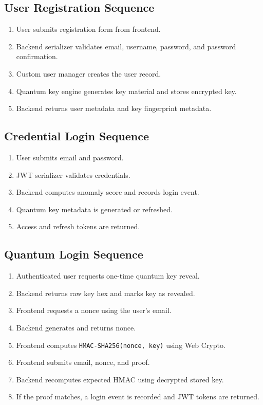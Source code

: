 \documentclass[12pt,a4paper]{report}
\begin{document}
\subsection{User Registration Sequence}
\begin{enumerate}
    \item User submits registration form from frontend.
    \item Backend serializer validates email, username, password, and password confirmation.
    \item Custom user manager creates the user record.
    \item Quantum key engine generates key material and stores encrypted key.
    \item Backend returns user metadata and key fingerprint metadata.
\end{enumerate}

\subsection{Credential Login Sequence}
\begin{enumerate}
    \item User submits email and password.
    \item JWT serializer validates credentials.
    \item Backend computes anomaly score and records login event.
    \item Quantum key metadata is generated or refreshed.
    \item Access and refresh tokens are returned.
\end{enumerate}

\subsection{Quantum Login Sequence}
\begin{enumerate}
    \item Authenticated user requests one-time quantum key reveal.
    \item Backend returns raw key hex and marks key as revealed.
    \item Frontend requests a nonce using the user's email.
    \item Backend generates and returns nonce.
    \item Frontend computes \texttt{HMAC-SHA256(nonce, key)} using Web Crypto.
    \item Frontend submits email, nonce, and proof.
    \item Backend recomputes expected HMAC using decrypted stored key.
    \item If the proof matches, a login event is recorded and JWT tokens are returned.
\end{enumerate}
\end{document}
